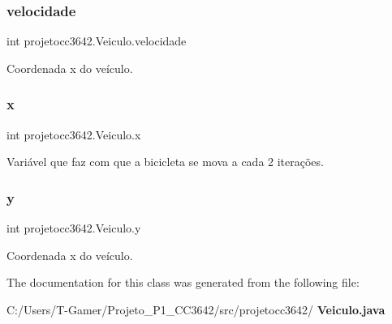 \mbox{\label{classprojetocc3642_1_1_veiculo_ae15060194405b0f6297413d738d6070d}} 
\subsubsection{velocidade}
{\footnotesize\ttfamily int projetocc3642.\+Veiculo.\+velocidade\hspace{0.3cm}{\ttfamily [private]}}



Coordenada x do veículo. 

\mbox{\label{classprojetocc3642_1_1_veiculo_a9b0f7dd30fb4621dc329a31cb99a1435}} 
\subsubsection{x}
{\footnotesize\ttfamily int projetocc3642.\+Veiculo.\+x\hspace{0.3cm}{\ttfamily [private]}}



Variável que faz com que a bicicleta se mova a cada 2 iterações. 

\mbox{\label{classprojetocc3642_1_1_veiculo_add4c4ca82855c09c7d88494d53b1033d}} 
\subsubsection{y}
{\footnotesize\ttfamily int projetocc3642.\+Veiculo.\+y\hspace{0.3cm}{\ttfamily [private]}}



Coordenada x do veículo. 



The documentation for this class was generated from the following file\+:\begin{DoxyCompactItemize}
\item 
C\+:/\+Users/\+T-\/\+Gamer/\+Projeto\+\_\+\+P1\+\_\+\+C\+C3642/src/projetocc3642/\textbf{ Veiculo.\+java}\end{DoxyCompactItemize}
